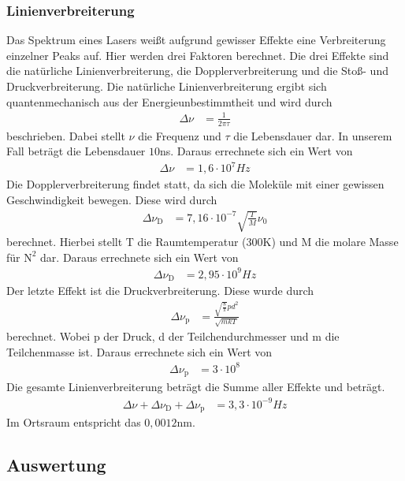 \documentclass[
	a4paper,
	12pt,
	pagesize,
	ngerman
]{scrartcl}
\begin{document}
\subsubsection{Linienverbreiterung}
Das Spektrum eines Lasers weißt aufgrund gewisser Effekte eine Verbreiterung einzelner Peaks auf. Hier werden drei Faktoren berechnet. Die drei Effekte sind die natürliche Linienverbreiterung, die Dopplerverbreiterung und die Stoß- und Druckverbreiterung.
Die natürliche Linienverbreiterung ergibt sich quantenmechanisch aus der Energieunbestimmtheit und wird durch 
\begin{align}
    \Delta\nu &= \frac{1}{2\pi\tau}
\end{align}
beschrieben. Dabei stellt $\nu$ die Frequenz und $\tau$ die Lebensdauer dar. In unserem Fall beträgt die Lebensdauer $10$ns.
Daraus errechnete sich ein Wert von 
\begin{align*}
     \Delta\nu &= 1,6 \cdot 10^7 Hz
\end{align*}
Die Dopplerverbreiterung findet statt, da sich die Moleküle mit einer gewissen Geschwindigkeit bewegen. Diese wird durch 
\begin{align}
    \Delta\nu_\text{D} &= 7,16 \cdot 10^{-7} \sqrt{\frac{T}{M}} \nu_0
\end{align}
berechnet. Hierbei stellt T die Raumtemperatur ($300$K)  und M die molare Masse für $\text{N}^2$ dar.
Daraus errechnete sich ein Wert von
\begin{align*}
      \Delta\nu_\text{D} &= 2,95 \cdot 10^9 Hz
\end{align*}
Der letzte Effekt ist die Druckverbreiterung. Diese wurde durch 
\begin{align}
    \Delta\nu_\text{p} &= \frac{\sqrt{\frac{8}{\pi}}pd^2}{\sqrt{mkT}}
\end{align}
berechnet. Wobei p der Druck, d der Teilchendurchmesser und m die Teilchenmasse ist. Daraus errechnete sich ein Wert von
\begin{align*}
       \Delta\nu_\text{p} &= 3 \cdot 10^8
\end{align*}
Die gesamte Linienverbreiterung beträgt die Summe aller Effekte und beträgt.
\begin{align*}
       \Delta\nu + \Delta\nu_\text{D} +  \Delta\nu_\text{p} &= 3,3 \cdot 10^{-9}Hz
\end{align*}
Im Ortsraum entspricht das $0,0012$nm.

\subsection{Auswertung}
\end{document}
